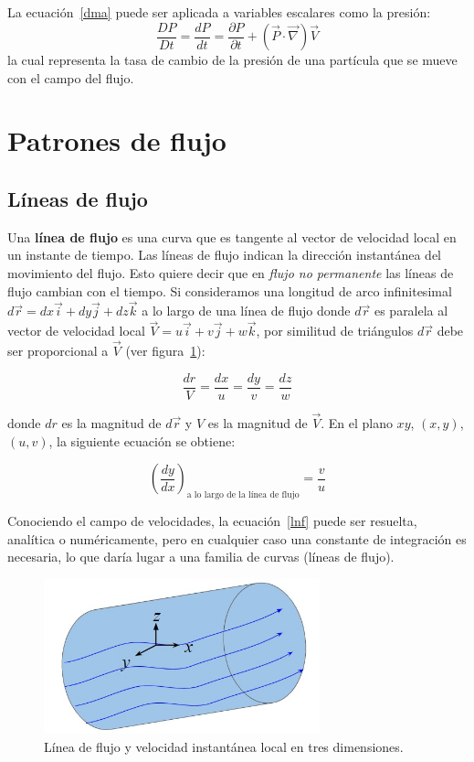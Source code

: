 \documentclass[10pt, oneside]{article}
\begin{document}
La ecuación~\ref{dma} puede ser aplicada a variables escalares como la presión:
$$
\frac{DP}{Dt}=\frac{dP}{dt}=\frac{\partial P}{\partial t} + (\vec{P} \cdot \vec{\nabla})\vec{V}
$$
la cual representa la tasa de cambio de la presión  de una partícula que se mueve con el campo del flujo.

\section{Patrones de flujo}

\subsection{Líneas de flujo}

Una \textbf{línea de flujo} es una curva que es tangente al vector de velocidad local en un instante de tiempo. Las líneas de flujo indican la dirección instantánea del movimiento del flujo. Esto quiere decir que en \emph{flujo no permanente} las líneas de flujo cambian con el tiempo. Si consideramos una longitud de arco infinitesimal $d\vec{r}=dx\vec{i}+dy\vec{j}+dz\vec{k}$ a lo largo de una línea de flujo donde $d\vec{r}$ es paralela al vector de velocidad local $\vec{V}=u\vec{i}+v\vec{j}+w\vec{k}$, por similitud de triángulos $d\vec{r}$ debe ser proporcional a $\vec{V}$ (ver figura~\ref{strl}):

$$
\frac{dr}{V}=\frac{dx}{u}=\frac{dy}{v}=\frac{dz}{w}
$$

donde $dr$ es la magnitud de $d\vec{r}$ y $V$ es la magnitud de $\vec{V}$. En el plano $xy$, $(x,y)$, $(u,v)$, la siguiente ecuación se obtiene: 

\begin{equation}
\left(\frac{dy}{dx}\right)_{\text{a lo largo de la línea de flujo}} = \frac{v}{u}
\label{lnf}
\end{equation}

Conociendo el campo de velocidades, la ecuación~\ref{lnf} puede ser resuelta, analítica o numéricamente, pero en cualquier caso una constante de integración es necesaria, lo que daría lugar a una familia de curvas (líneas de flujo).

\begin{figure}[h]
\centering
\includegraphics[width=8cm]{Fig.3.jpg}
\caption{Línea de flujo y velocidad instantánea local en tres dimensiones.}
\label{strl}
\end{figure}
\end{document}
